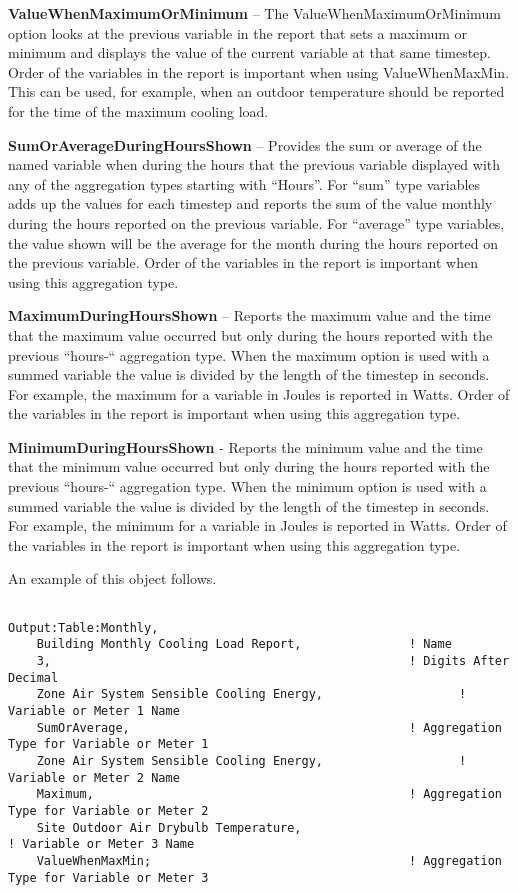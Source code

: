 \textbf{ValueWhenMaximumOrMinimum} -- The ValueWhenMaximumOrMinimum option looks at the previous variable in the report that sets a maximum or minimum and displays the value of the current variable at that same timestep. Order of the variables in the report is important when using ValueWhenMaxMin. This can be used, for example, when an outdoor temperature should be reported for the time of the maximum cooling load.

\textbf{SumOrAverageDuringHoursShown} -- Provides the sum or average of the named variable when during the hours that the previous variable displayed with any of the aggregation types starting with ``Hours''. For ``sum'' type variables adds up the values for each timestep and reports the sum of the value monthly during the hours reported on the previous variable. For ``average'' type variables, the value shown will be the average for the month during the hours reported on the previous variable. Order of the variables in the report is important when using this aggregation type.

\textbf{MaximumDuringHoursShown} -- Reports the maximum value and the time that the maximum value occurred but only during the hours reported with the previous ``hours-`` aggregation type. When the maximum option is used with a summed variable the value is divided by the length of the timestep in seconds. For example, the maximum for a variable in Joules is reported in Watts. Order of the variables in the report is important when using this aggregation type.

\textbf{MinimumDuringHoursShown} - Reports the minimum value and the time that the minimum value occurred but only during the hours reported with the previous ``hours-`` aggregation type. When the minimum option is used with a summed variable the value is divided by the length of the timestep in seconds. For example, the minimum for a variable in Joules is reported in Watts. Order of the variables in the report is important when using this aggregation type.

An example of this object follows.

\begin{lstlisting}

Output:Table:Monthly,
    Building Monthly Cooling Load Report,               ! Name
    3,                                                  ! Digits After Decimal
    Zone Air System Sensible Cooling Energy,                   ! Variable or Meter 1 Name
    SumOrAverage,                                       ! Aggregation Type for Variable or Meter 1
    Zone Air System Sensible Cooling Energy,                   ! Variable or Meter 2 Name
    Maximum,                                            ! Aggregation Type for Variable or Meter 2
    Site Outdoor Air Drybulb Temperature,                                   ! Variable or Meter 3 Name
    ValueWhenMaxMin;                                    ! Aggregation Type for Variable or Meter 3
\end{lstlisting}